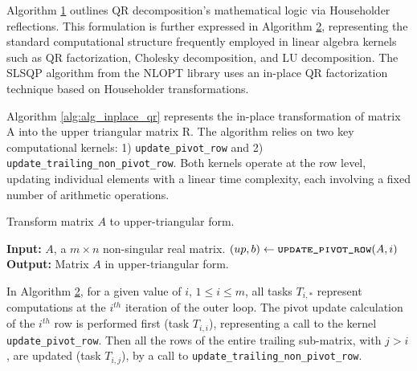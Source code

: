 Algorithm \hyperref[alg:householder_qr]{1} outlines QR decomposition's mathematical logic via Householder reflections. This formulation is further expressed in Algorithm \hyperref[alg:alg_inplace_qr]{2}, representing the standard computational structure frequently employed in linear algebra kernels such as QR factorization, Cholesky decomposition, and LU decomposition. The SLSQP algorithm from the NLOPT library uses an in-place QR factorization technique based on Householder transformations.

Algorithm \ref{alg:alg_inplace_qr} represents the in-place transformation of matrix A into the upper triangular matrix R. The algorithm relies on two key computational kernels: 1) \texttt{update\_pivot\_row} and 2) \texttt{update\_trailing\_non\_pivot\_row}. Both kernels operate at the row level, updating individual elements with a linear time complexity, each involving a fixed number of arithmetic operations.
\begin{algorithm}
	\caption{Transform matrix $A$ to upper-triangular form.} \label{alg:alg_inplace_qr}
	\begin{algorithmic}[1]
		\State \textbf{Input:} $A$, a $m \times n$ non-singular real matrix.
		\State $(up, b) \gets \Call{\texttt{update\_pivot\_row}}{A, i}$
		\State {}
		\EndFor
		\EndFor
		\State \textbf{Output:} Matrix $A$ in upper-triangular form.
	\end{algorithmic}
\end{algorithm}

In Algorithm \hyperref[alg:alg_inplace_qr]{2}, for a given value of $i$, $1\leq i\leq m$, all tasks $T_{i,*}$ represent computations at the $i^{th}$ iteration of the outer loop. The pivot update calculation of the $i^{th}$ row is performed first (task $T_{i,i}$), representing a call to the kernel \texttt{update\_pivot\_row}. Then all the rows of the entire trailing sub-matrix, with $j > i$, are updated (task $T_{i,j}$), by a  call to \texttt{update\_trailing\_non\_pivot\_row}. 

